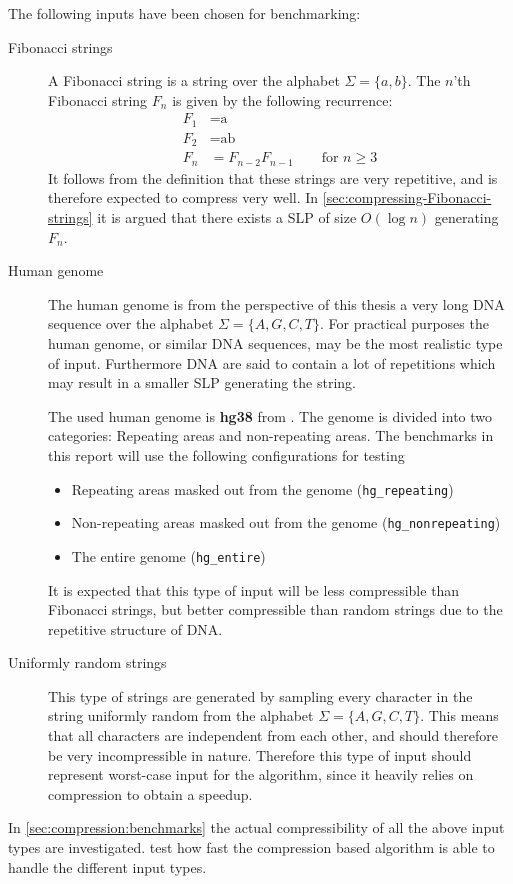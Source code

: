 \documentclass[twoside,11pt,openright]{report}
\begin{document}
The following inputs have been chosen for benchmarking:
\begin{description}
  \item[Fibonacci strings] A Fibonacci string is a string over the alphabet $\Sigma = \{a,b\}$. The $n$'th Fibonacci string $F_n$ is given by the following recurrence:
    \begin{align*}
      F_1 &= \text{a} \\
      F_2 &= \text{ab} \\
      F_{n} &= F_{n - 2} F_{n - 1} \quad\quad \text{for } n \geq 3
    \end{align*}
    It follows from the definition that these strings are very repetitive, and is therefore expected to compress very well. In \cref{sec:compressing-Fibonacci-strings} it is argued that there exists a SLP of size $O(\log{n})$ generating $F_n$.
  \item[Human genome] The human genome is from the perspective of this thesis a very long DNA sequence over the alphabet $\Sigma = \{A,G,C,T\}$. For practical purposes the human genome, or similar DNA sequences, may be the most realistic type of input. Furthermore DNA are said to contain a lot of repetitions which may result in a smaller SLP generating the string.

   The used human genome is \textbf{hg38} from \cite{HumanGenome}. The genome is divided into two categories: Repeating areas and non-repeating areas. The benchmarks in this report will use the following configurations for testing
  \begin{itemize}
    \item Repeating areas masked out from the genome (\texttt{hg\_repeating})
    \item Non-repeating areas masked out from the genome (\texttt{hg\_nonrepeating})
    \item The entire genome (\texttt{hg\_entire})
  \end{itemize}
  It is expected that this type of input will be less compressible than Fibonacci strings, but better compressible than random strings due to the repetitive structure of DNA.

  \item[Uniformly random strings] This type of strings are generated by sampling every character in the string uniformly random from the alphabet $\Sigma = \{A,G,C,T\}$. This means that all characters are independent from each other, and should therefore be very incompressible in nature. Therefore this type of input should represent worst-case input for the algorithm, since it heavily relies on compression to obtain a speedup.
\end{description}
In \cref{sec:compression:benchmarks} the actual compressibility of all the above input types are investigated.  test how fast the compression based algorithm is able to handle the different input types.
\end{document}
